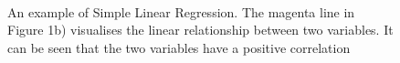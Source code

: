 \documentclass[a4paper,11pt,twoside]{article}
\begin{document}
\begin{figure} [h!]
\captionsetup{justification=centering}
\\
\caption{An example of Simple Linear Regression. The magenta line in Figure 1b) visualises the linear relationship between two variables. It can be seen that the two variables have a positive correlation}
\end{figure}
\end{document}
